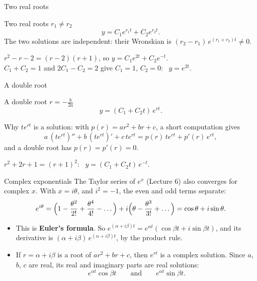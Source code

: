 \documentclass[10pt]{wosm-slides}
\begin{document}
\begin{frame}{Two real roots}
  \begin{block}{Two real roots $r_1 \ne r_2$}
    \[ y = C_1 e^{r_1 t} + C_2 e^{r_2 t} . \]
    The two solutions are independent: their Wronskian is $(r_2 - r_1)\, e^{(r_1 + r_2)t} \ne 0$.
  \end{block}
  \pause
  \begin{example}[$y'' - y' - 2y = 0$, \ $y(0) = 1$, $y'(0) = 2$]
    $r^2 - r - 2 = (r - 2)(r + 1)$, so $y = C_1 e^{2t} + C_2 e^{-t}$.
    \\[0.2em]
    $C_1 + C_2 = 1$ and $2C_1 - C_2 = 2$ give $C_1 = 1$, $C_2 = 0$: \ $y = e^{2t}$.
  \end{example}
\end{frame}

\begin{frame}{A double root}
  \begin{block}{A double root $r = -\frac{b}{2a}$}
    \[ y = (C_1 + C_2 t)\, e^{rt} . \]
  \end{block}
  \pause
  Why $te^{rt}$ is a solution: with $p(r) = ar^2 + br + c$, a short computation gives
  \[ a\,(te^{rt})'' + b\,(te^{rt})' + c\,te^{rt} = p(r)\, t e^{rt} + p'(r)\, e^{rt} , \]
  and a double root has $p(r) = p'(r) = 0$.
  \pause
  \begin{example}[$y'' + 2y' + y = 0$]
    $r^2 + 2r + 1 = (r + 1)^2$: \ $y = (C_1 + C_2 t)\, e^{-t}$.
  \end{example}
\end{frame}

\begin{frame}{Complex exponentials}
  The Taylor series of $e^x$ (Lecture 6) also converges for complex $x$. With $x = i\theta$, and
  $i^2 = -1$, the even and odd terms separate:
  \[ e^{i\theta} = \Bigl(1 - \frac{\theta^2}{2!} + \frac{\theta^4}{4!} - \dots\Bigr)
     + i\Bigl(\theta - \frac{\theta^3}{3!} + \dots\Bigr) = \cos\theta + i\sin\theta . \]
  \pause
  \begin{itemize}
    \item This is \textbf{Euler's formula}. So $e^{(\alpha + i\beta)t} = e^{\alpha t}(\cos\beta t + i\sin\beta t)$,
      and its derivative is $(\alpha + i\beta)\, e^{(\alpha + i\beta)t}$, by the product rule.
    \pause
    \item If $r = \alpha + i\beta$ is a root of $ar^2 + br + c$, then $e^{rt}$ is a complex solution. Since
      $a$, $b$, $c$ are real, its real and imaginary parts are real solutions:
      \[ e^{\alpha t}\cos\beta t \qquad\text{and}\qquad e^{\alpha t}\sin\beta t . \]
  \end{itemize}
\end{frame}
\end{document}
